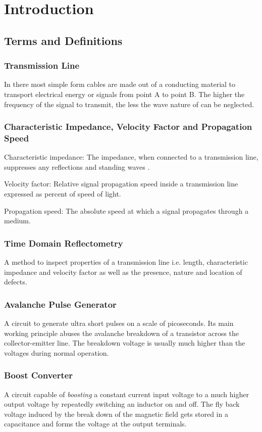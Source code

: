\chapter{Introduction}
%
\section{Terms and Definitions}
    \subsection*{Transmission Line}\label{sec:transmissionLine}
        In there most simple form cables are made out of a conducting material to transport electrical energy or signals from point
        A to point B. The higher the frequency of the signal to transmit, the less the wave nature of can be neglected.
    \subsection*{Characteristic Impedance, Velocity Factor and Propagation Speed}
        Characteristic impedance: The impedance, when connected to a transmission line, suppresses any reflections and standing
        waves \cite{ATIS.AmericanTelecomStandards2001}.\par
        Velocity factor: Relative signal propagation speed inside a transmission line expressed as percent of speed of light.\par
        Propagation speed: The absolute speed at which a signal propagates through a medium.
    \subsection*{Time Domain Reflectometry}
        A method to inspect properties of a transmission line i.e. length, characteristic impedance and velocity factor as
        well as the presence, nature and location of defects.
    \subsection*{Avalanche Pulse Generator}
        A circuit to generate ultra short pulses on a scale of picoseconds. Its main working principle abuses the avalanche
        breakdown of a transistor across the collector-emitter line. The breakdown voltage is usually much higher than the
        voltages during normal operation.
    \subsection*{Boost Converter}
        A circuit capable of \textit{boosting} a constant current input voltage to a much higher output voltage by repeatedly
        switching an inductor on and off. The fly back voltage induced by the break down of the magnetic field gets stored in
        a capacitance and forms the voltage at the output terminals.
